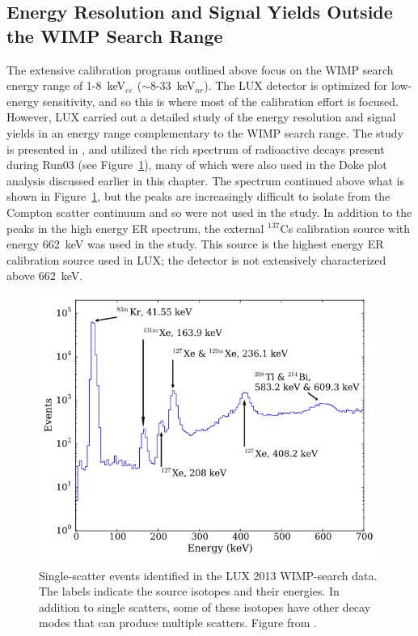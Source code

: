 \subsection{Energy Resolution and Signal Yields Outside the WIMP Search Range}
\label{sec:highenergyyeilds}
The extensive calibration programs outlined above focus on the \ac{WIMP} search energy range of 1-8~keV$_{ee}$ ($\sim$8-33~keV$_{nr}$). The \ac{LUX} detector is optimized for low-energy sensitivity, and so this is where most of the calibration effort is focused. However, \ac{LUX} carried out a detailed study of the energy resolution and signal yields in an energy range complementary to the \ac{WIMP} search range. The study is presented in \cite{LUX:YieldsAndRecombination}, and utilized the rich spectrum of radioactive decays present during Run03 (see Figure~\ref{fig:luxspectrum}), many of which were also used in the Doke plot analysis discussed earlier in this chapter. The spectrum continued above what is shown in Figure~\ref{fig:luxspectrum}, but the peaks are increasingly difficult to isolate from the Compton scatter continuum and so were not used in the study. In addition to the peaks in the high energy \ac{ER} spectrum, the external $^{137}$Cs calibration source with energy 662~keV was used in the study. This source is the highest energy \ac{ER} calibration source used in \ac{LUX}; the detector is not extensively characterized above 662~keV. 

\begin{figure}[htbp]
\begin{center}
\includegraphics[width=\textwidth]{figures/lux/luxspectrum.png}
\caption{Single-scatter events identified in the \acs{LUX} 2013 \acs{WIMP}-search data. The labels indicate the source isotopes and their energies. In addition to single scatters, some of these isotopes have other decay modes that can produce multiple scatters. Figure from \cite{LUX:YieldsAndRecombination}.}
\label{fig:luxspectrum}
\end{center}
\end{figure}

